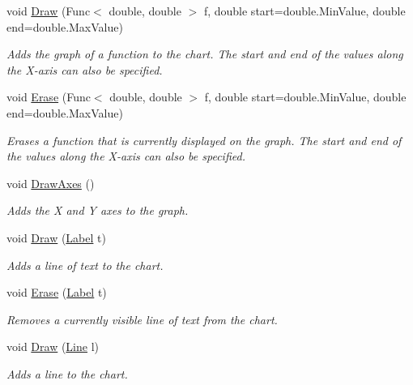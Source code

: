 \begin{DoxyCompactItemize}
void \mbox{\hyperlink{class_s_g_l_1_1_graph_acdd26dba75282796ec6d22b5be177b7e}{Draw}} (Func$<$ double, double $>$ f, double start=double.\+Min\+Value, double end=double.\+Max\+Value)
\begin{DoxyCompactList}\small\item\em Adds the graph of a function to the chart. The start and end of the values along the X-\/axis can also be specified. \end{DoxyCompactList}\item 
void \mbox{\hyperlink{class_s_g_l_1_1_graph_ae56a2ac44e31ab8e8dae5dc042e8515d}{Erase}} (Func$<$ double, double $>$ f, double start=double.\+Min\+Value, double end=double.\+Max\+Value)
\begin{DoxyCompactList}\small\item\em Erases a function that is currently displayed on the graph. The start and end of the values along the X-\/axis can also be specified. \end{DoxyCompactList}\item 
void \mbox{\hyperlink{class_s_g_l_1_1_graph_ab406eaa6b30080e663cd2152e8fd36d2}{Draw\+Axes}} ()
\begin{DoxyCompactList}\small\item\em Adds the X and Y axes to the graph. \end{DoxyCompactList}\item 
void \mbox{\hyperlink{class_s_g_l_1_1_graph_a5fa59d087be175868fe52c4b81f4c724}{Draw}} (\mbox{\hyperlink{class_s_g_l_1_1_label}{Label}} t)
\begin{DoxyCompactList}\small\item\em Adds a line of text to the chart. \end{DoxyCompactList}\item 
void \mbox{\hyperlink{class_s_g_l_1_1_graph_a794de8a13de541b1b6e43a94469a1801}{Erase}} (\mbox{\hyperlink{class_s_g_l_1_1_label}{Label}} t)
\begin{DoxyCompactList}\small\item\em Removes a currently visible line of text from the chart. \end{DoxyCompactList}\item 
void \mbox{\hyperlink{class_s_g_l_1_1_graph_ae4409704a5d6224c6f8a007977922bb8}{Draw}} (\mbox{\hyperlink{class_s_g_l_1_1_line}{Line}} l)
\begin{DoxyCompactList}\small\item\em Adds a line to the chart. \end{DoxyCompactList}\item 

\end{DoxyCompactItemize}
